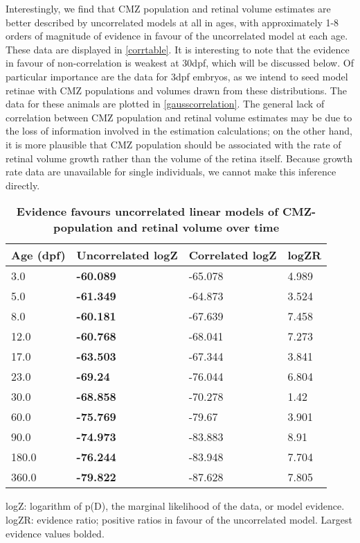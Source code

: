 Interestingly, we find that CMZ population and retinal volume estimates are better described by uncorrelated models at all in ages, with approximately 1-8 orders of magnitude of evidence in favour of the uncorrelated model at each age. These data are displayed in \autoref{corrtable}. It is interesting to note that the evidence in favour of non-correlation is weakest at 30dpf, which will be discussed below. Of particular importance are the data for 3dpf embryos, as we intend to seed model retinae with CMZ populations and volumes drawn from these distributions. The data for these animals are plotted in \autoref{gausscorrelation}. The general lack of correlation between CMZ population and retinal volume estimates may be due to the loss of information involved in the estimation calculations; on the other hand, it is more plausible that CMZ population should be associated with the rate of retinal volume growth rather than the volume of the retina itself. Because growth rate data are unavailable for single individuals, we cannot make this inference directly.

\begin{table}[!ht]
    \centering
    \caption{{\bf Evidence favours uncorrelated linear models of CMZ-population and retinal volume over time}}
    \begin{tabular}{|l|l|l|l|}
        \hline
        {\bf Age (dpf)} & {\bf Uncorrelated logZ} & {\bf Correlated logZ} & {\bf logZR}\\ \hline
        3.0 & {\bf -60.089} & -65.078 & 4.989\\ \hline
        5.0 & {\bf -61.349} & -64.873 & 3.524\\ \hline
        8.0 & {\bf -60.181} & -67.639 & 7.458\\ \hline
        12.0 & {\bf -60.768} & -68.041 & 7.273\\ \hline
        17.0 & {\bf -63.503} & -67.344 & 3.841\\ \hline
        23.0 & {\bf -69.24} & -76.044 & 6.804\\ \hline
        30.0 & {\bf -68.858} & -70.278 & 1.42\\ \hline
        60.0 & {\bf -75.769} & -79.67 & 3.901\\ \hline
        90.0 & {\bf -74.973} & -83.883 & 8.91\\ \hline
        180.0 & {\bf -76.244} & -83.948 & 7.704\\ \hline
        360.0 & {\bf -79.822} & -87.628 & 7.805\\ \hline
        \end{tabular}
    \begin{flushleft} logZ: logarithm of p(D), the marginal likelihood of the data, or model evidence. logZR: evidence ratio; positive ratios in favour of the uncorrelated model. Largest evidence values bolded.
    \end{flushleft}
    \label{corrtable}
\end{table}

